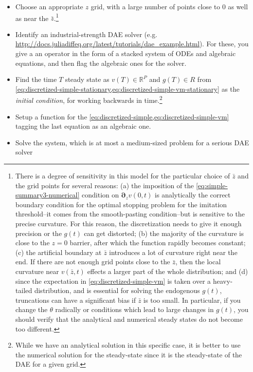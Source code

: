 \documentclass[11pt]{article}
\newcommand{\D}[1][]{\ensuremath{\boldsymbol{\partial}_{#1}}}
\newcommand{\R}{\ensuremath{\mathbb{R}}}
\begin{document}
\begin{itemize}
	\item Choose an appropriate $z$ grid, with a large number of points close to $0$ as well as near the $\bar{z}$.\footnote{There is a degree of sensitivity in this model for the particular choice of $\bar{z}$ and the grid points for several reasons: (a) the imposition of the \cref{eq:simple-summary3-numerical} condition on $\D[z]v(0,t)$  is analytically the correct boundary condition for the optimal stopping problem for the imitation threshold--it comes from the smooth-pasting condition--but is sensitive to the precise curvature.  For this reason, the discretization needs to give it enough precision or the $g(t)$ can get distorted; (b) the majority of the curvature is close to the $z=0$ barrier, after which the function rapidly becomes constant; (c) the artificial boundary at $\bar{z}$ introduces a lot of curvature right near the end.  If there are not enough grid points close to the $\bar{z}$, then the local curvature near $v(\bar{z},t)$ effects a larger part of the whole distribution; and (d) since the expectation in \cref{eq:discretized-simple-vm} is taken over a heavy-tailed distribution, and is essential for solving the endogenous $g(t)$, truncations can have a significant bias if $\bar{z}$ is too small.  In particular, if you change the $\theta$ radically or conditions which lead to large changes in $g(t)$, you should verify that the analytical and numerical steady states do not become too different.}
	\item Identify an industrial-strength DAE solver (e.g. \url{http://docs.juliadiffeq.org/latest/tutorials/dae_example.html}).  For these, you give a an operator in the form of a stacked system of ODEs and algebraic equations, and then flag the algebraic ones for the solver.
	\item Find the time $T$ steady state as $v(T) \in \R^P$ and $g(T) \in R$ from \cref{eq:discretized-simple-stationary,eq:discretized-simple-vm-stationary} as the \textit{initial condition}, for working backwards in time.\footnote{While we have an analytical solution in this specific case, it is better to use the numerical solution for the steady-state since it is the steady-state of the DAE for a given grid.}
	\item Setup a function for the \cref{eq:discretized-simple,eq:discretized-simple-vm} tagging the last equation as an algebraic one.
	\item Solve the system, which is at most a medium-sized problem for a serious DAE solver
\end{itemize}
\end{document}
